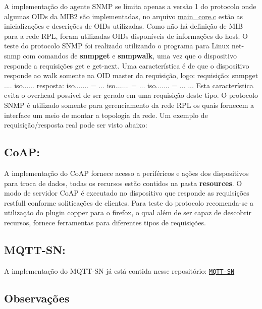 A implementação do agente S\+N\+M\+P se limita apenas a versão 1 do protocolo onde algumas O\+I\+Ds da M\+I\+B2 são implementadas, no arquivo \hyperlink{main__core_8c}{main\+\_\+core.\+c} estão as inicializações e descrições de O\+I\+Ds utilizadas. Como não há definição de M\+I\+B para a rede R\+P\+L, foram utilizadas O\+I\+Ds disponíveis de informações do host. O teste do protocolo S\+N\+M\+P foi realizado utilizando o programa para Linux net-\/snmp com comandos de {\bfseries snmpget} e {\bfseries snmpwalk}, uma vez que o dispositivo responde a requisições get e get-\/next. Uma característica é de que o dispositivo responde ao walk somente na O\+I\+D master da requisição, logo\+: requisição\+: snmpget .... iso...... resposta\+: iso....... = ... iso....... = ... iso....... = ... ... Esta característica evita o overhead possível de ser gerado em uma requisição deste tipo. O protocolo S\+N\+M\+P é utilizado somente para gerenciamento da rede R\+P\+L os quais fornecem a interface um meio de montar a topologia da rede. Um exemplo de requisição/resposta real pode ser visto abaixo\+: 

\subsection*{Co\+A\+P\+:}

A implementação do Co\+A\+P fornece acesso a periféricos e ações dos dispositivos para troca de dados, todas os recursos estão contidos na pasta {\bfseries resources}. O modo de servidor Co\+A\+P é executado no dispositivo que responde as requisições restfull conforme soliticações de clientes. Para teste do protocolo recomenda-\/se a utilização do plugin copper para o firefox, o qual além de ser capaz de descobrir recursos, fornece ferramentas para diferentes tipos de requisições. 

\subsection*{M\+Q\+T\+T-\/\+S\+N\+:}

A implementação do M\+Q\+T\+T-\/\+S\+N já está contida nesse repositório\+: \href{https://github.com/aignacio/MQTT-SN-Contiki---HomeStark}{\tt M\+Q\+T\+T-\/\+S\+N}

\subsection*{Observações}

